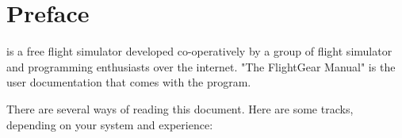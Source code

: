 
\chapter{Preface}
\label{preface}

\FlightGear{} is a free flight simulator developed co-operatively by a group of flight
simulator and programming enthusiasts over the internet. "The
FlightGear Manual" is the user documentation that comes with the
program.

There are several ways of reading this document. Here are some tracks, depending on your
system and experience:







